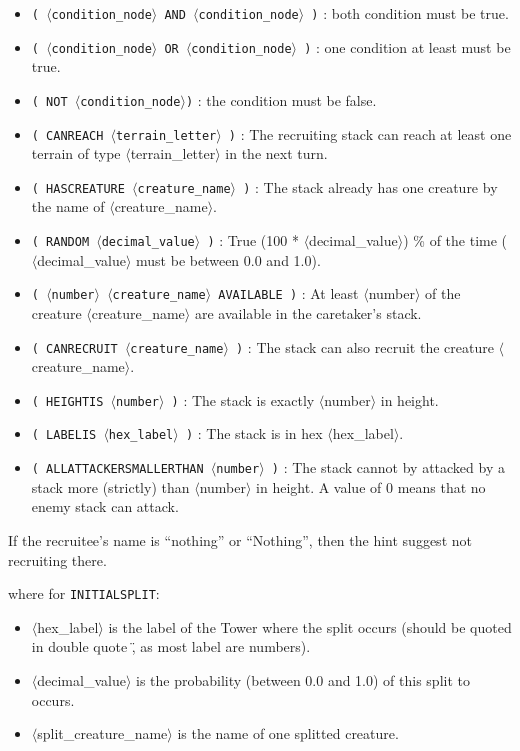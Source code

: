 \documentclass{article}
\begin{document}
\begin{itemize}
\item \texttt{( $\langle$condition\_node$\rangle$ AND $\langle$condition\_node$\rangle$ )} : both condition must be true.
\item \texttt{( $\langle$condition\_node$\rangle$ OR $\langle$condition\_node$\rangle$ )} : one condition at least must be true.
\item \texttt{( NOT $\langle$condition\_node$\rangle$)} : the condition must be false.
\item \texttt{( CANREACH $\langle$terrain\_letter$\rangle$ )} : The recruiting stack can reach at least one terrain of type $\langle$terrain\_letter$\rangle$ in the next turn.
\item \texttt{( HASCREATURE $\langle$creature\_name$\rangle$ )} : The stack already has one creature by the name of $\langle$creature\_name$\rangle$.
\item \texttt{( RANDOM $\langle$decimal\_value$\rangle$ )} : True (100 * $\langle$decimal\_value$\rangle$) \% of the time ($\langle$decimal\_value$\rangle$ must be between 0.0 and 1.0).
\item \texttt{( $\langle$number$\rangle$ $\langle$creature\_name$\rangle$ AVAILABLE )} : At least $\langle$number$\rangle$ of the creature $\langle$creature\_name$\rangle$ are available in the caretaker's stack.
\item \texttt{( CANRECRUIT $\langle$creature\_name$\rangle$ )} : The stack can also recruit the creature $\langle$creature\_name$\rangle$.
\item \texttt{( HEIGHTIS $\langle$number$\rangle$ )} : The stack is exactly $\langle$number$\rangle$ in height.
\item \texttt{( LABELIS $\langle$hex\_label$\rangle$ )} : The stack is in hex $\langle$hex\_label$\rangle$.
\item \texttt{( ALLATTACKERSMALLERTHAN $\langle$number$\rangle$ )} : The stack cannot by attacked by a stack more (strictly) than $\langle$number$\rangle$ in height. A value of 0 means that no enemy stack can attack.
\end{itemize}

If the recruitee's name is ``nothing'' or ``Nothing'', then the hint suggest not recruiting there.

where for \texttt{INITIALSPLIT}:

\begin{itemize}
\item $\langle$hex\_label$\rangle$ is the label of the Tower where the split occurs (should be quoted in double quote \", as most label are numbers).
\item $\langle$decimal\_value$\rangle$ is the probability (between 0.0 and 1.0) of this split to occurs.
\item $\langle$split\_creature\_name$\rangle$ is the name of one splitted creature.
\end{itemize}
\end{document}
